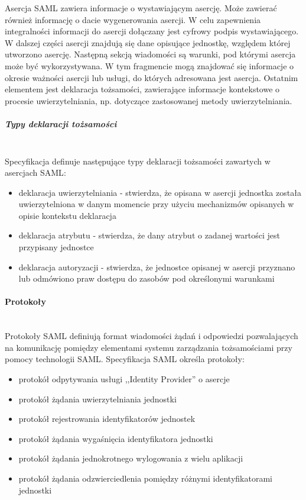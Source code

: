 				Asercja SAML zawiera informacje o wystawiającym asercję. Może zawierać również informację o dacie wygenerowania asercji. W celu zapewnienia integralności informacji do asercji dołączany jest cyfrowy podpis wystawiającego. W dalszej części asercji znajdują się dane opisujące jednostkę, względem której utworzono asercję. Następną sekcją wiadomości są warunki, pod którymi asercja może być wykorzystywana. W tym fragmencie mogą znajdować się informacje o okresie ważności asercji lub usługi, do których adresowana jest asercja. Ostatnim elementem jest deklaracja tożsamości, zawierające informacje kontekstowe o procesie uwierzytelniania, np. dotyczące zastosowanej metody uwierzytelniania.

			\subparagraph{Typy deklaracji tożsamości}\mbox{}\\

				Specyfikacja definuje następujące typy deklaracji tożsamości zawartych w asercjach SAML\cite{Wisniewski05}:

				\begin{itemize}
				  \item deklaracja uwierzytelniania - stwierdza, że opisana w asercji jednostka została uwierzytelniona w danym momencie przy użyciu mechanizmów opisanych w opisie kontekstu deklaracja
				  \item deklaracja atrybutu - stwierdza, że dany atrybut o zadanej wartości jest przypisany jednostce
				  \item deklaracja autoryzacji - stwierdza, że jednostce opisanej w asercji przyznano lub odmówiono praw dostępu do zasobów pod określonymi warunkami
				 \end{itemize}

		\paragraph{Protokoły}\mbox{}\\ 

			Protokoły SAML definiują format wiadomości żądań i odpowiedzi pozwalających na komunikację pomiędzy elementami systemu zarządzania tożsamościami przy pomocy technologii SAML. Specyfikacja SAML określa protokoły:

			\begin{itemize}
			  \item protokół odpytywania usługi ,,Identity Provider'' o asercje
			  \item protokół żądania uwierzytelniania jednostki
			  \item protokół rejestrowania identyfikatorów jednostek
			  \item protokół żądania wygaśnięcia identyfikatora jednostki
			  \item protokół żądania jednokrotnego wylogowania z wielu aplikacji
			  \item protokół żądania odzwierciedlenia pomiędzy różnymi identyfikatorami jednostki
			\end{itemize}


